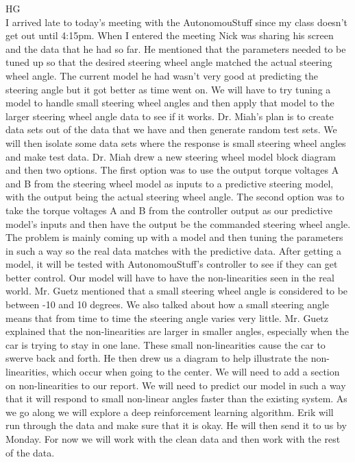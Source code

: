 \documentclass[fontsize=11pt, %
                             paper=letter, %
                             openany, %
                             captions=tableheading,
                             index=totoc,
                             hyperref]{labbook}
\def\currentYear{2021}
\begin{document}
\begin{addmargin}[0cm]{0cm}

\labday{Thursday, October 21, \currentYear}
HG\\
I arrived late to today's meeting with the AutonomouStuff since my class doesn't get out until 4:15pm. When I entered the meeting Nick was sharing his screen and the data that he had so far. He mentioned that the parameters needed to be tuned up so that the desired steering wheel angle matched the actual steering wheel angle. The current model he had wasn't very good at predicting the steering angle but it got better as time went on. We will have to try tuning a model to handle small steering wheel angles and then apply that model to the larger steering wheel angle data to see if it works. Dr. Miah's plan is to create data sets out of the data that we have and then generate random test sets. We will then isolate some data sets where the response is small steering wheel angles and make test data. Dr. Miah drew a new steering wheel model block diagram and then two options. The first option was to use the output torque voltages A and B from the steering wheel model as inputs to a predictive steering model, with the output being the actual steering wheel angle. The second option was to take the torque voltages A and B from the controller output as our predictive model's inputs and then have the output be the commanded steering wheel angle. The problem is mainly coming up with a model and then tuning the parameters in such a way so the real data matches with the predictive data. After getting a model, it will be tested with AutonomouStuff's controller to see if they can get better control. Our model will have to have the non-linearities seen in the real world. Mr. Guetz mentioned that a small steering wheel angle is considered to be between -10 and 10 degrees. We also talked about how a small steering angle means that from time to time the steering angle varies very little. Mr. Guetz explained that the non-linearities are larger in smaller angles, especially when the car is trying to stay in one lane. These small non-linearities cause the car to swerve back and forth. He then drew us a diagram to help illustrate the non-linearities, which occur when going to the center. We will need to add a section on non-linearities to our report. We will need to predict our model in such a way that it will respond to small non-linear angles faster than the existing system. As we go along we will explore a deep reinforcement learning algorithm. Erik will run through the data and make sure that it is okay. He will then send it to us by Monday. For now we will work with the clean data and then work with the rest of the data.


\end{addmargin}
\end{document}
